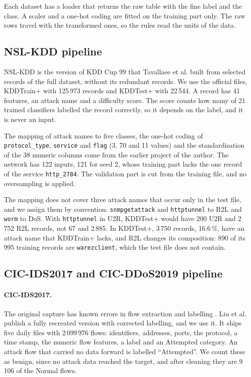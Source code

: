 Each dataset has a loader that returns the raw table with the fine label and the class. A
scaler and a one-hot coding are fitted on the training part only. The raw rows travel with the
transformed ones, so the rules read the units of the data.

\subsection{NSL-KDD pipeline}
\label{sec:impl-nslkdd}

NSL-KDD is the version of KDD Cup 99 that Tavallaee et al. \citep{tavallaee2009kddcup99} built
from selected records of the full dataset, without its redundant records. We use the official files, KDDTrain+ with 125\,973 records and
KDDTest+ with 22\,544. A record has 41 features, an attack name and a difficulty score. The score
counts how many of 21 trained classifiers labelled the record correctly, so it depends on the
label, and it is never an input.

The mapping of attack names to five classes, the one-hot coding of \texttt{protocol\_type},
\texttt{service} and \texttt{flag} (3, 70 and 11 values) and the standardisation of the 38
numeric columns come from the earlier project of the author. The network has 122 inputs, 121
for seed 2, whose training part lacks the one record of the service \texttt{http\_2784}. The
validation part is cut from the training file, and no oversampling is applied.

The mapping does not cover three attack names that occur only in the test file, and we assign
them by convention:
\texttt{snmpgetattack} and \texttt{httptunnel} to R2L and \texttt{worm} to DoS. With
\texttt{httptunnel} in U2R, KDDTest+ would have 200 U2R and 2\,752 R2L records, not 67 and
2\,885. In KDDTest+, 3\,750 records, 16.6\,\%, have an attack name that KDDTrain+ lacks, and
R2L changes its composition: 890 of its 995 training records are \texttt{warezclient}, which the
test file does not contain.

\subsection{CIC-IDS2017 and CIC-DDoS2019 pipeline}
\label{sec:impl-cic}

\paragraph{CIC-IDS2017.}
The original capture \citep{sharafaldin2018cicids2017} has known errors in flow extraction and
labelling \citep{engelen2021troubleshooting}. Liu et al. \citep{liu2022error} publish a fully
recreated version with corrected labelling, and we use it. It ships five daily files
with 2\,099\,976 flows: identifiers, addresses, ports, the protocol, a time stamp, the numeric
flow features, a label and an Attempted category. An attack flow that carried no data forward is
labelled ``Attempted''.
We count these as benign, since no attack data reached the target, and
after cleaning they are 9\,106 of the Normal flows.


